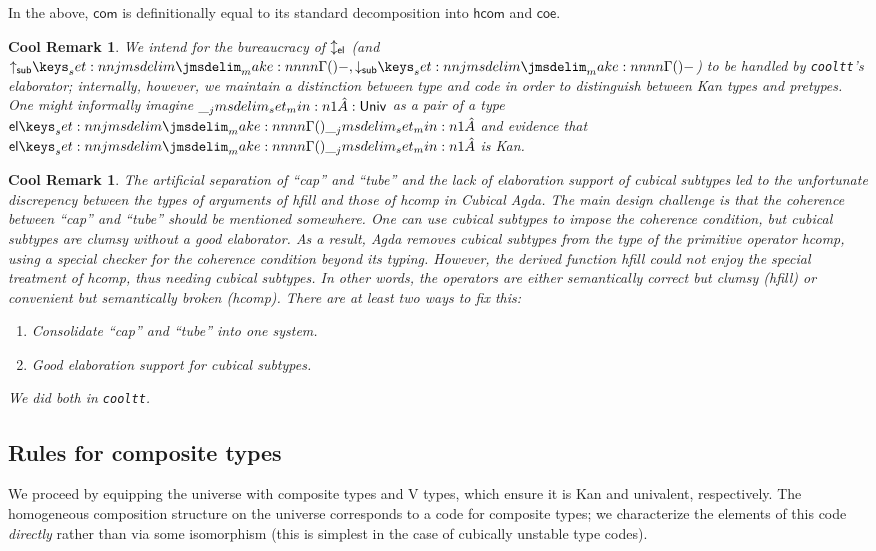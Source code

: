 \documentclass[draft]{amsart}
\newtheorem{cool}[theorem]{Cool Remark}
\begin{document}
In the above, $\mathsf{com}$ is definitionally equal to its standard
decomposition into $\mathsf{hcom}$ and $\mathsf{coe}$.

\begin{cool}
We intend for the bureaucracy of ${\updownarrow_{\mathsf{el}}}$ (and $\SubIn{-},\SubOut{-}$) to be
handled by \texttt{cooltt}'s elaborator; internally, however, we maintain a
distinction between type and code in order to distinguish between Kan types and
pretypes. One might informally imagine $\__jmsdelim_set_min:n {1}\hat{A}:\mathsf{Univ}$ as a pair of a type
$\TpEl{\Code{A}}$ and evidence that $\TpEl{\Code{A}}$ is Kan.
\end{cool}

\begin{cool}
  The artificial separation of ``cap'' and ``tube'' and the lack of elaboration support of cubical subtypes led to the unfortunate discrepency between the types of arguments of \textsf{hfill} and those of \textsf{hcomp} in Cubical Agda. The main design challenge is that the coherence between ``cap'' and ``tube'' should be mentioned somewhere. One can use cubical subtypes to impose the coherence condition, but cubical subtypes are clumsy without a good elaborator. As a result, Agda removes cubical subtypes from the type of the primitive operator \textsf{hcomp}, using a special checker for the coherence condition beyond its typing. However, the derived function \textsf{hfill} could not enjoy the special treatment of \textsf{hcomp}, thus needing cubical subtypes. In other words, the operators are either semantically correct but clumsy (\textsf{hfill}) or convenient but semantically broken (\textsf{hcomp}). There are at least two ways to fix this:
  \begin{enumerate}
    \item Consolidate ``cap'' and ``tube'' into one system.
    \item Good elaboration support for cubical subtypes.
  \end{enumerate}
  We did both in \texttt{cooltt}.
\end{cool}

\subsection{Rules for composite types}

We proceed by equipping the universe with composite types and V types, which
ensure it is Kan and univalent, respectively. The homogeneous composition
structure on the universe corresponds to a code for composite types; we
characterize the elements of this code \emph{directly} rather than via some
isomorphism (this is simplest in the case of cubically unstable type codes).
\end{document}
